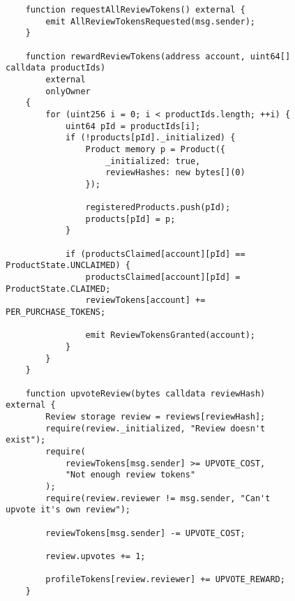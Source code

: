 \begin{figure}[H]
    \begin{verbatim}
    function requestAllReviewTokens() external {
        emit AllReviewTokensRequested(msg.sender);
    }

    function rewardReviewTokens(address account, uint64[] calldata productIds)
        external
        onlyOwner
    {
        for (uint256 i = 0; i < productIds.length; ++i) {
            uint64 pId = productIds[i];
            if (!products[pId]._initialized) {
                Product memory p = Product({
                    _initialized: true,
                    reviewHashes: new bytes[](0)
                });

                registeredProducts.push(pId);
                products[pId] = p;
            }

            if (productsClaimed[account][pId] == ProductState.UNCLAIMED) {
                productsClaimed[account][pId] = ProductState.CLAIMED;
                reviewTokens[account] += PER_PURCHASE_TOKENS;

                emit ReviewTokensGranted(account);
            }
        }
    }

    function upvoteReview(bytes calldata reviewHash) external {
        Review storage review = reviews[reviewHash];
        require(review._initialized, "Review doesn't exist");
        require(
            reviewTokens[msg.sender] >= UPVOTE_COST,
            "Not enough review tokens"
        );
        require(review.reviewer != msg.sender, "Can't upvote it's own review");

        reviewTokens[msg.sender] -= UPVOTE_COST;

        review.upvotes += 1;

        profileTokens[review.reviewer] += UPVOTE_REWARD;
    }
    \end{verbatim}
    \label{code:}
    \caption{}
\end{figure}


